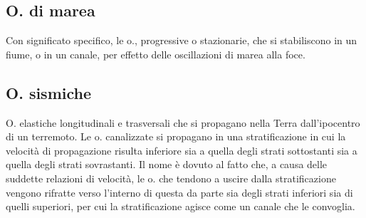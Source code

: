 \documentclass[a4paper]{article}
\begin{document}
\subsection{O. di marea}
Con significato specifico, le o., progressive o stazionarie, che si stabiliscono in un fiume, o in un canale, per effetto delle oscillazioni di marea alla foce. 

\subsection{O. sismiche}
O. elastiche longitudinali e trasversali che si propagano nella Terra dall’ipocentro di un terremoto. Le o. canalizzate si propagano in una stratificazione in cui la velocità di propagazione risulta inferiore sia a quella degli strati sottostanti sia a quella degli strati sovrastanti. Il nome è dovuto al fatto che, a causa delle suddette relazioni di velocità, le o. che tendono a uscire dalla stratificazione vengono rifratte verso l’interno di questa da parte sia degli strati inferiori sia di quelli superiori, per cui la stratificazione agisce come un canale che le convoglia. 
\end{document}

